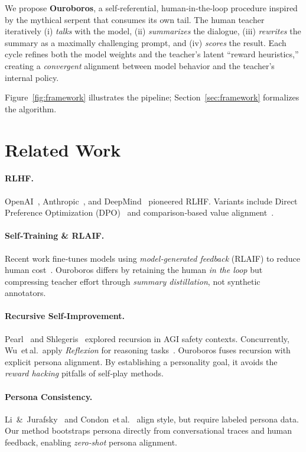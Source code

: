 \documentclass[11pt]{article}
\begin{document}
We propose \textbf{Ouroboros}, a self‑referential, human‑in‑the‑loop procedure inspired by the mythical serpent that consumes its own tail.  The human teacher iteratively (i) \emph{talks} with the model, (ii) \emph{summarizes} the dialogue, (iii) \emph{rewrites} the summary as a maximally challenging prompt, and (iv) \emph{scores} the result.  Each cycle refines both the model weights and the teacher’s latent ``reward heuristics,'' creating a \emph{convergent} alignment between model behavior and the teacher’s internal policy.

Figure~\ref{fig:framework} illustrates the pipeline; Section~\ref{sec:framework} formalizes the algorithm.

\section{Related Work}
\label{sec:related}
\paragraph{RLHF.} OpenAI~\cite{ouyang2022training}, Anthropic~\cite{bai2022constitutional}, and DeepMind~\cite{nakano2022feedme} pioneered RLHF\@. Variants include Direct Preference Optimization (DPO)~\cite{rafailov2023dpo} and comparison‑based value alignment~\cite{stefanovitch2024human}.

\paragraph{Self‑Training \& RLAIF.} Recent work fine‑tunes models using \emph{model‑generated feedback} (RLAIF) to reduce human cost~\cite{huang2023selfrewarding,scheurer2024rlaif}.  Ouroboros differs by retaining the human \emph{in the loop} but compressing teacher effort through \emph{summary distillation}, not synthetic annotators.

\paragraph{Recursive Self‑Improvement.} Pearl~\cite{pearl2023recursive} and Shlegeris~\cite{shlegeris2019ida} explored recursion in AGI safety contexts.  Concurrently, Wu et al.\ apply \emph{Reflexion} for reasoning tasks~\cite{wu2023reflexion}.  Ouroboros fuses recursion with explicit persona alignment. By establishing a personality goal, it avoids the \emph{reward hacking} pitfalls of self‑play methods.

\paragraph{Persona Consistency.}  Li~\&~Jurafsky~\cite{li2016persona} and Condon et al.~\cite{condon2022cascaded} align style, but require labeled persona data.  Our method bootstraps persona directly from conversational traces and human feedback, enabling \emph{zero‑shot} persona alignment.
\end{document}
